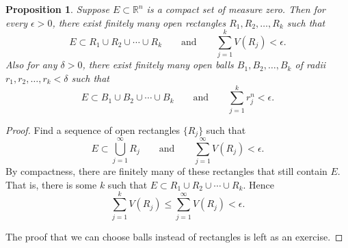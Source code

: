 \documentclass[12pt]{book}
\newcommand{\R}{{\mathbb{R}}}
\theoremstyle{plain}
\newtheorem{prop}[thm]{Proposition}
\theoremstyle{remark}
\theoremstyle{definition}
\theoremstyle{exercise}
\theoremstyle{example}
\begin{document}
\begin{prop} \label{mv:prop:compactnull}
Suppose $E \subset \R^n$ is a compact set of measure zero.  Then for
every $\epsilon > 0$, there exist
finitely many open rectangles $R_1,R_2,\ldots,R_k$ such that
\begin{equation*}
E \subset R_1 \cup R_2 \cup \cdots \cup R_k
\qquad \text{and} \qquad
\sum_{j=1}^k V(R_j) < \epsilon.
\end{equation*}
Also for any $\delta > 0$,
there exist finitely many open balls $B_1,B_2,\ldots,B_k$ of radii
$r_1,r_2,\ldots,r_k < \delta$ such that
\begin{equation*}
E \subset B_1 \cup B_2 \cup \cdots \cup B_k
\qquad \text{and} \qquad
\sum_{j=1}^k r_j^n < \epsilon.
\end{equation*}
\end{prop}

\begin{proof}
Find a sequence of open rectangles $\{ R_j \}$ such that 
\begin{equation*}
E \subset \bigcup_{j=1}^\infty R_j
\qquad \text{and} \qquad
\sum_{j=1}^\infty V(R_j) < \epsilon.
\end{equation*}
By compactness, there are finitely
many of these rectangles that still contain $E$.  That is, there is some $k$ such
that
$E \subset R_1 \cup R_2 \cup \cdots \cup R_k$.  Hence
\begin{equation*}
\sum_{j=1}^k V(R_j) \leq
\sum_{j=1}^\infty V(R_j) < \epsilon.
\end{equation*}

The proof that we can choose balls instead of rectangles is left as an
exercise.
\end{proof}
\end{document}
